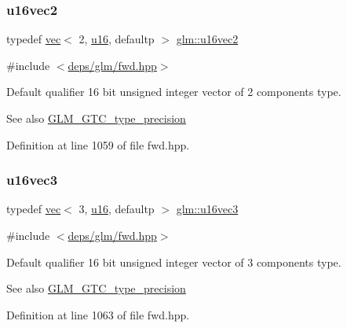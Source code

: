 \subsubsection{\texorpdfstring{u16vec2}{u16vec2}}
{\footnotesize\ttfamily typedef \hyperlink{structglm_1_1vec}{vec}$<$ 2, \hyperlink{group__gtc__type__precision_gae7a1571503f83d2264ddfa705a6b082a}{u16}, defaultp $>$ \hyperlink{group__gtc__type__precision_ga50bd2ceeb100a187e7c46f135269a0ec}{glm\+::u16vec2}}



{\ttfamily \#include $<$\hyperlink{fwd_8hpp}{deps/glm/fwd.\+hpp}$>$}

Default qualifier 16 bit unsigned integer vector of 2 components type. \begin{DoxySeeAlso}{See also}
\hyperlink{group__gtc__type__precision}{G\+L\+M\+\_\+\+G\+T\+C\+\_\+type\+\_\+precision} 
\end{DoxySeeAlso}


Definition at line 1059 of file fwd.\+hpp.

\mbox{\label{group__gtc__type__precision_gad60f14d1abd39b480cbe5c5cf848071a}} 
\subsubsection{\texorpdfstring{u16vec3}{u16vec3}}
{\footnotesize\ttfamily typedef \hyperlink{structglm_1_1vec}{vec}$<$ 3, \hyperlink{group__gtc__type__precision_gae7a1571503f83d2264ddfa705a6b082a}{u16}, defaultp $>$ \hyperlink{group__gtc__type__precision_gad60f14d1abd39b480cbe5c5cf848071a}{glm\+::u16vec3}}



{\ttfamily \#include $<$\hyperlink{fwd_8hpp}{deps/glm/fwd.\+hpp}$>$}

Default qualifier 16 bit unsigned integer vector of 3 components type. \begin{DoxySeeAlso}{See also}
\hyperlink{group__gtc__type__precision}{G\+L\+M\+\_\+\+G\+T\+C\+\_\+type\+\_\+precision} 
\end{DoxySeeAlso}


Definition at line 1063 of file fwd.\+hpp.

\mbox{\label{group__gtc__type__precision_ga049d45ad8d0f78578d7ceb86a7fdaae4}} 
